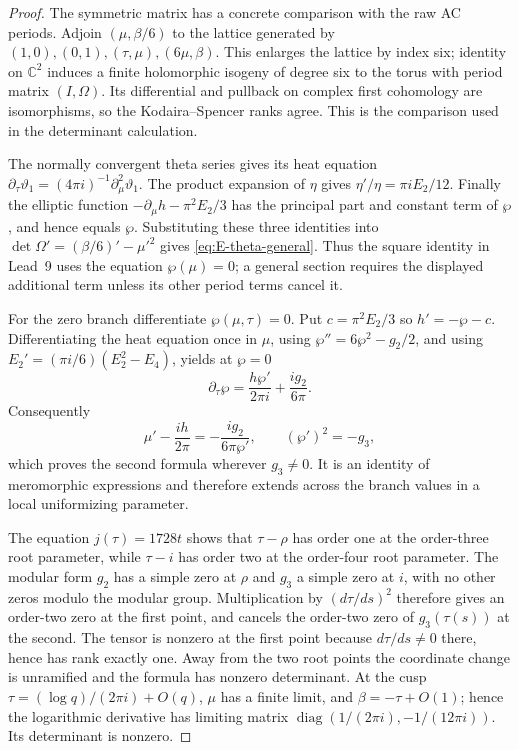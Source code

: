 \begin{proof}
The symmetric matrix has a concrete comparison with the raw AC
periods. Adjoin $(\mu,\beta/6)$ to the lattice generated by
$(1,0),(0,1),(\tau,\mu),(6\mu,\beta)$. This enlarges the
lattice by index six; identity on $\mathbb C^2$ induces a finite
holomorphic isogeny of degree six to the torus with period matrix
$(I,\Omega)$. Its differential and pullback on complex first
cohomology are isomorphisms, so the Kodaira--Spencer ranks agree.
This is the comparison used in the determinant calculation.

The normally convergent theta series gives its heat equation
$\partial_\tau\vartheta_1=(4\pi i)^{-1}\partial_\mu^2\vartheta_1$.
The product expansion of $\eta$ gives
$\eta'/\eta=\pi i E_2/12$. Finally the elliptic function
$-\partial_\mu h-\pi^2E_2/3$ has the principal part and constant
term of $\wp$, and hence equals $\wp$. Substituting these three
identities into
$\det\Omega'=(\beta/6)'-\mu'^2$ gives
\eqref{eq:E-theta-general}. Thus the square identity in Lead~9
uses the equation $\wp(\mu)=0$; a general section requires the
displayed additional term unless its other period terms cancel it.

For the zero branch differentiate $\wp(\mu,\tau)=0$. Put
$c=\pi^2E_2/3$ so $h'=-\wp-c$. Differentiating the heat equation
once in $\mu$, using $\wp''=6\wp^2-g_2/2$, and using
$E_2'=(\pi i/6)(E_2^2-E_4)$, yields at $\wp=0$
\[
 \partial_\tau\wp=\frac{h\wp'}{2\pi i}
                       +\frac{i g_2}{6\pi}.
\]
Consequently
\[
 \mu'-\frac{i h}{2\pi}=-\frac{i g_2}{6\pi\wp'},
 \qquad (\wp')^2=-g_3,
\]
which proves the second formula wherever $g_3\ne0$. It is an
identity of meromorphic expressions and therefore extends across
the branch values in a local uniformizing parameter.

The equation $j(\tau)=1728t$ shows that $\tau-\rho$ has order one
at the order-three root parameter, while $\tau-i$ has order two
at the order-four root parameter. The modular form $g_2$ has a
simple zero at $\rho$ and $g_3$ a simple zero at $i$, with no
other zeros modulo the modular group. Multiplication by
$(d\tau/ds)^2$ therefore gives an order-two zero at the first
point, and cancels the order-two zero of $g_3(\tau(s))$ at the
second. The tensor is nonzero at the first point because
$d\tau/ds\ne0$ there, hence has rank exactly one. Away from the
two root points the coordinate change is unramified and the
formula has nonzero determinant. At the cusp
$\tau=(\log q)/(2\pi i)+O(q)$, $\mu$ has a finite limit, and
$\beta=-\tau+O(1)$; hence the logarithmic derivative has limiting
matrix $\operatorname{diag}(1/(2\pi i),-1/(12\pi i))$.
Its determinant is nonzero.
\end{proof}


